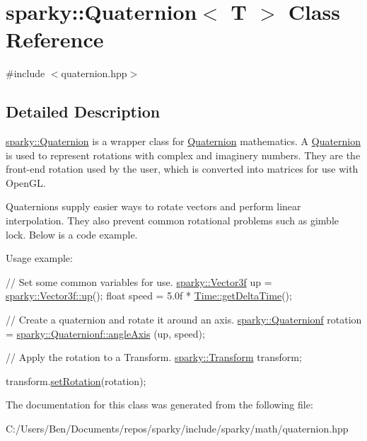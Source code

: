 \hypertarget{classsparky_1_1_quaternion_3_01_t_01_4}{}\section{sparky\+:\+:Quaternion$<$ T $>$ Class Reference}
\label{classsparky_1_1_quaternion_3_01_t_01_4}


{\ttfamily \#include $<$quaternion.\+hpp$>$}



\subsection{Detailed Description}
\hyperlink{classsparky_1_1_quaternion}{sparky\+::\+Quaternion} is a wrapper class for \hyperlink{classsparky_1_1_quaternion}{Quaternion} mathematics. A \hyperlink{classsparky_1_1_quaternion}{Quaternion} is used to represent rotations with complex and imaginery numbers. They are the front-\/end rotation used by the user, which is converted into matrices for use with Open\+GL.

Quaternions supply easier ways to rotate vectors and perform linear interpolation. They also prevent common rotational problems such as gimble lock. Below is a code example.

Usage example\+: 
\begin{DoxyCode}
\textcolor{comment}{// Set some common variables for use.}
\hyperlink{classsparky_1_1_vector3}{sparky::Vector3f} up = \hyperlink{classsparky_1_1_vector3_af54c2e1458f00c76b06c61641c856c95}{sparky::Vector3f::up}();
\textcolor{keywordtype}{float} speed = 5.0f * \hyperlink{classsparky_1_1_time_af216f91f65a7631ee3e1974a244f697b}{Time::getDeltaTime}();

\textcolor{comment}{// Create a quaternion and rotate it around an axis.}
\hyperlink{classsparky_1_1_quaternion}{sparky::Quaternionf} rotation = \hyperlink{classsparky_1_1_quaternion_a66ae7960536a332a5d2e133bb14bc5c5}{sparky::Quaternionf::angleAxis}
      (up, speed);

\textcolor{comment}{// Apply the rotation to a Transform.}
\hyperlink{classsparky_1_1_transform}{sparky::Transform} transform;

transform.\hyperlink{classsparky_1_1_transform_a870405b2aa4bd13ffa48a8e072f7bf3b}{setRotation}(rotation);
\end{DoxyCode}
 

The documentation for this class was generated from the following file\+:\begin{DoxyCompactItemize}
\item 
C\+:/\+Users/\+Ben/\+Documents/repos/sparky/include/sparky/math/quaternion.\+hpp\end{DoxyCompactItemize}
